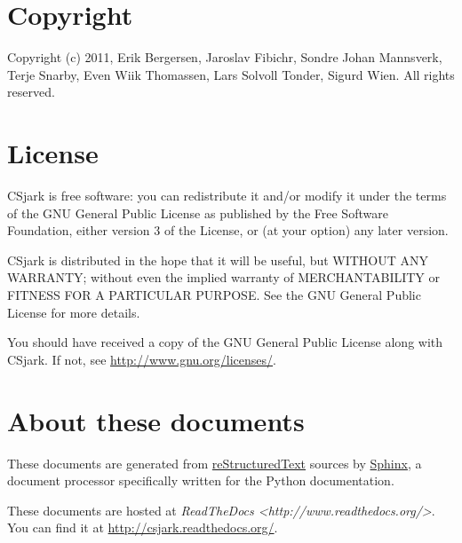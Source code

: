 \documentclass[A4paper,10pt,english]{sphinxmanual}
\begin{document}
\section{Copyright}
\label{other/license::doc}\label{other/license:copyright}
Copyright (c) 2011, Erik Bergersen, Jaroslav Fibichr, Sondre Johan Mannsverk, Terje Snarby, Even Wiik Thomassen, Lars Solvoll Tonder, Sigurd Wien. All rights reserved.


\section{License}
\label{other/license:license}\label{other/license:id1}
CSjark is free software: you can redistribute it and/or modify
it under the terms of the GNU General Public License as published by
the Free Software Foundation, either version 3 of the License, or
(at your option) any later version.

CSjark is distributed in the hope that it will be useful,
but WITHOUT ANY WARRANTY; without even the implied warranty of
MERCHANTABILITY or FITNESS FOR A PARTICULAR PURPOSE.  See the
GNU General Public License for more details.

You should have received a copy of the GNU General Public License
along with CSjark.  If not, see \href{http://www.gnu.org/licenses/}{http://www.gnu.org/licenses/}.


\section{About these documents}
\label{other/about::doc}\label{other/about:about-these-documents}
These documents are generated from \href{http://docutils.sf.net/rst.html}{reStructuredText} sources by \href{http://sphinx.pocoo.org}{Sphinx}, a
document processor specifically written for the Python documentation.

These documents are hosted at \emph{ReadTheDocs \textless{}http://www.readthedocs.org/\textgreater{}}. You can find it at \href{http://csjark.readthedocs.org/}{http://csjark.readthedocs.org/}.
\end{document}
